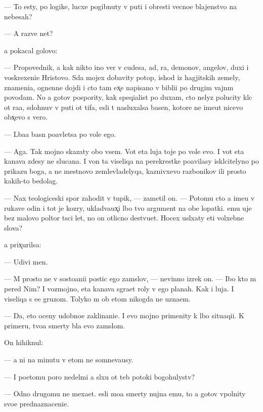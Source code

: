 \documentclass[10pt]{book}
\begin{document}
— To {\y}esty, po logike, lucxe pogibnuty v puti i obresti vecno{\y}e blajenstvo na nebesah?

— A razve net?

{\Y}a pokacal golovo{\y}:

— Propovednik, {\y}a kak nikto ino{\y} ver{\iu} v cudesa, ad, ra{\y}, demonov, angelov, duxi i voskrexeni{\y}e Hristovo. S{\iu}da mojex dobavity potop, ishod iz hagjitskih zemely, znameni{\y}a, ognenn{\yi}{\y}e dojdi i cto tam {\y}ex̨e napisano v bibli{\y}i po drugim vajn{\yi}m povodam. No {\y}a gotov pospority, kak speqialist po duxam, cto nelyz{\ia} polucity kl{\iu}c ot ra{\y}a, sdohnuv v puti ot tifa, {\y}esli t{\yi} nasluxalsa basen, kotor{\yi}{\y}e ne ime{\y}ut nicevo obx̨evo s vero{\y}.

— L{\iu}ba{\y}a basn{\ia} po{\y}avl{\ia}{\y}etsa po vole {\Y}ego.

— Aga. Tak mojno skazaty obo vsem. Vot eta luja toje po vole {\y}evo. I vot eta kanava zdesy ne sluca{\y}na. I von ta viseliqa na perekrestke po{\y}avilasy iskl{\iu}citelyno po prikazu boga, a ne mestnovo zemlevladelyqa, kaznivxevo razbo{\y}nikov ili prosto kakih-to bedolag.

— Nax teologiceski{\y} spor zahodit v tupik, — zametil on. — Potomu cto {\y}a ime{\y}u v rukave odin i tot je koz{\yi}ry, uklad{\yi}va{\y}ux̨i{\y} l{\iu}bo{\y} tvo{\y} argument na obe lopatki. {\Y}emu uje bez malovo poltor{\yi} t{\yi}s{\ia}ci let, no on otlicno de{\y}stvu{\y}et. Hocex usl{\yi}xaty eti volxebn{\yi}{\y}e slova?

{\Y}a prix̨urilsa:

— Udivi men{\ia}.

— M{\yi} prosto ne v sosto{\y}ani{\y}i postic {\Y}ego zam{\yi}slov, — nevinno izrek on. — Ibo kto m{\yi} pered Nim? I vozmojno, eta kanava s{\yi}gra{\y}et roly v {\Y}ego planah. Kak i luja. I viseliqa s {\y}e{\y}e gruzom. Tolyko m{\yi} ob etom nikogda ne uzna{\y}em.

— Da, eto oceny udobno{\y}e zaklinani{\y}e. I {\y}evo mojno primenity k l{\iu}bo{\y} situaqi{\y}i. K primeru, tvo{\y}a smerty b{\yi}la {\y}evo zam{\yi}slom.

On hihiknul:

— {\Y}a ni na minutu v etom ne somneva{\y}usy.

— I poetomu poro{\y} nedel{\ia}mi {\y}a sl{\yi}xu ot teb{\ia} potoki bogohulystv?

— Odno drugomu ne mexa{\y}et. {\Y}esli mo{\y}a smerty nujna {\Y}emu, to {\y}a gotov v{\yi}polnity svo{\y}e prednaznaceni{\y}e.
\end{document}
